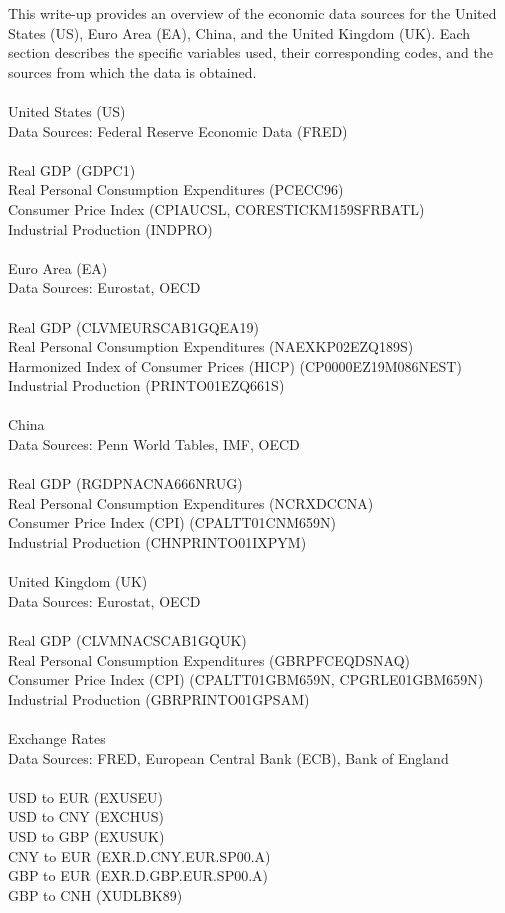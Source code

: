 \documentclass{article}
\begin{document}
This write-up provides an overview of the economic data sources for the United States (US), Euro Area (EA), China, and the United Kingdom (UK). Each section describes the specific variables used, their corresponding codes, and the sources from which the data is obtained.\\
\\
United States (US)\\
Data Sources: Federal Reserve Economic Data (FRED)\\
\\
Real GDP (GDPC1)\\
Real Personal Consumption Expenditures (PCECC96)\\
Consumer Price Index (CPIAUCSL, CORESTICKM159SFRBATL)\\
Industrial Production (INDPRO)\\
\\
Euro Area (EA)\\
Data Sources: Eurostat, OECD\\
\\
Real GDP (CLVMEURSCAB1GQEA19)\\
Real Personal Consumption Expenditures (NAEXKP02EZQ189S)\\
Harmonized Index of Consumer Prices (HICP) (CP0000EZ19M086NEST)\\
Industrial Production (PRINTO01EZQ661S)\\
\\
China\\
Data Sources: Penn World Tables, IMF, OECD\\
\\
Real GDP (RGDPNACNA666NRUG)\\
Real Personal Consumption Expenditures (NCRXDCCNA)\\
Consumer Price Index (CPI) (CPALTT01CNM659N)\\
Industrial Production (CHNPRINTO01IXPYM)\\
\\
United Kingdom (UK)\\
Data Sources: Eurostat, OECD\\
\\
Real GDP (CLVMNACSCAB1GQUK)\\
Real Personal Consumption Expenditures (GBRPFCEQDSNAQ)\\
Consumer Price Index (CPI) (CPALTT01GBM659N, CPGRLE01GBM659N)\\
Industrial Production (GBRPRINTO01GPSAM)\\
\\
Exchange Rates\\
Data Sources: FRED, European Central Bank (ECB), Bank of England\\
\\
USD to EUR (EXUSEU)\\
USD to CNY (EXCHUS)\\
USD to GBP (EXUSUK)\\
CNY to EUR (EXR.D.CNY.EUR.SP00.A)\\
GBP to EUR (EXR.D.GBP.EUR.SP00.A)\\
GBP to CNH (XUDLBK89)\\
\end{document}
